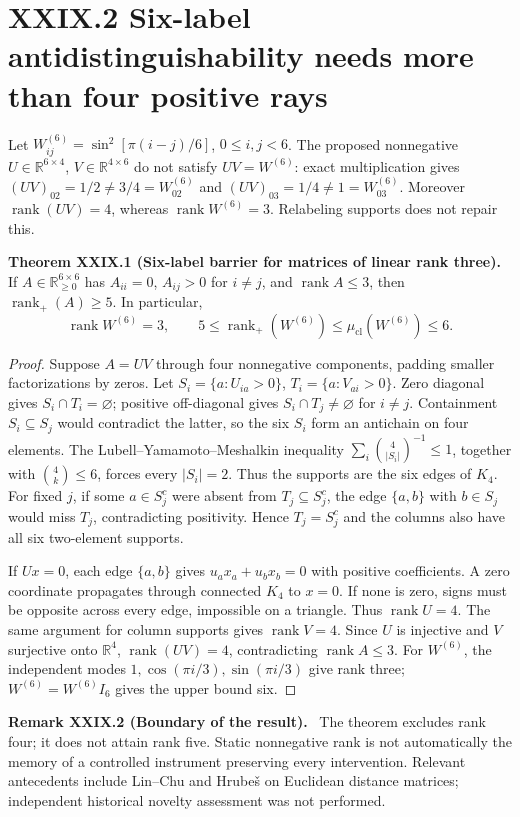 \documentclass[11pt,a4paper,oneside]{book}
\newcommand{\R}{\mathbb R}\newcommand{\C}{\mathbb C}\newcommand{\Z}{\mathbb Z}\newcommand{\N}{\mathbb N}\newcommand{\Q}{\mathbb Q}
\DeclareMathOperator{\rank}{rank}\DeclareMathOperator{\Tr}{Tr}
\newcommand{\statement}[3]{\par\medskip\noindent\textbf{#1 #2 (#3).}\ }
\begin{document}
\section*{XXIX.2 Six-label antidistinguishability needs more than four positive rays}
Let $W^{(6)}_{ij}=\sin^2[\pi(i-j)/6]$, $0\le i,j<6$. The proposed nonnegative $U\in\R^{6\times4}$, $V\in\R^{4\times6}$ do not satisfy $UV=W^{(6)}$: exact multiplication gives $(UV)_{02}=1/2\ne3/4=W^{(6)}_{02}$ and $(UV)_{03}=1/4\ne1=W^{(6)}_{03}$. Moreover $\rank(UV)=4$, whereas $\rank W^{(6)}=3$. Relabeling supports does not repair this.
\statement{Theorem}{XXIX.1}{Six-label barrier for matrices of linear rank three} If $A\in\R_{\ge0}^{6\times6}$ has $A_{ii}=0$, $A_{ij}>0$ for $i\ne j$, and $\rank A\le3$, then $\rank_+(A)\ge5$. In particular,
\[\rank W^{(6)}=3,\qquad5\le\rank_+(W^{(6)})\le\mu_{\mathrm{cl}}(W^{(6)})\le6.\]
\begin{proof}Suppose $A=UV$ through four nonnegative components, padding smaller factorizations by zeros. Let $S_i=\{a:U_{ia}>0\}$, $T_i=\{a:V_{ai}>0\}$. Zero diagonal gives $S_i\cap T_i=\varnothing$; positive off-diagonal gives $S_i\cap T_j\ne\varnothing$ for $i\ne j$. Containment $S_i\subseteq S_j$ would contradict the latter, so the six $S_i$ form an antichain on four elements. The Lubell--Yamamoto--Meshalkin inequality $\sum_i\binom4{|S_i|}^{-1}\le1$, together with $\binom4k\le6$, forces every $|S_i|=2$. Thus the supports are the six edges of $K_4$. For fixed $j$, if some $a\in S_j^c$ were absent from $T_j\subseteq S_j^c$, the edge $\{a,b\}$ with $b\in S_j$ would miss $T_j$, contradicting positivity. Hence $T_j=S_j^c$ and the columns also have all six two-element supports.

If $Ux=0$, each edge $\{a,b\}$ gives $u_ax_a+u_bx_b=0$ with positive coefficients. A zero coordinate propagates through connected $K_4$ to $x=0$. If none is zero, signs must be opposite across every edge, impossible on a triangle. Thus $\rank U=4$. The same argument for column supports gives $\rank V=4$. Since $U$ is injective and $V$ surjective onto $\R^4$, $\rank(UV)=4$, contradicting $\rank A\le3$. For $W^{(6)}$, the independent modes $1,\cos(\pi i/3),\sin(\pi i/3)$ give rank three; $W^{(6)}=W^{(6)}I_6$ gives the upper bound six.\end{proof}
\statement{Remark}{XXIX.2}{Boundary of the result} The theorem excludes rank four; it does not attain rank five. Static nonnegative rank is not automatically the memory of a controlled instrument preserving every intervention. Relevant antecedents include Lin--Chu and Hrube\v s on Euclidean distance matrices; independent historical novelty assessment was not performed.
\end{document}
